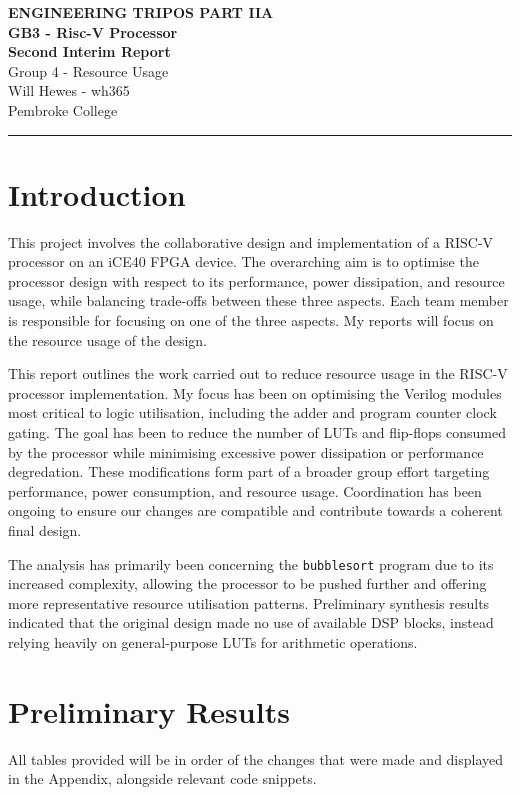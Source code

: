 \documentclass[a4paper,10pt]{article}
\renewcommand{\maketitle}{
    \begin{center}
        \LARGE \textbf{ENGINEERING TRIPOS PART IIA} \\ 
        \vspace{0.5em}
        \Large \textbf{GB3 - Risc-V Processor} \\ 
        \vspace{0.5em}
        \textbf{Second Interim Report} \\
        \large Group 4 - Resource Usage \\
        \vspace{1em}
        \large Will Hewes - wh365 \\ 
        Pembroke College \\ 
        \vspace{0.5em}
    \end{center}
}
\begin{document}
%
\maketitle
\hrule
\tableofcontents
\newpage

\section{Introduction}
\label{sec:Introduction}

This project involves the collaborative design and implementation 
of a RISC-V processor on an iCE40 FPGA device. 
The overarching aim is to optimise 
the processor design with respect to its 
performance, power dissipation, and resource usage, 
while balancing trade-offs between these three aspects. 
Each team member is responsible for focusing on one of the three aspects.
My reports will focus on the resource usage of the design.

This report outlines the work carried out to reduce resource usage 
in the RISC-V processor implementation. 
My focus has been on optimising the Verilog modules 
most critical to logic utilisation, 
including the adder and program counter clock gating. 
The goal has been to reduce the number of LUTs and flip-flops consumed
by the processor while minimising 
excessive power dissipation or performance degredation.
These modifications form part of a broader group effort targeting performance, 
power consumption, and resource usage. 
Coordination has been ongoing to ensure our changes are compatible and 
contribute towards a coherent final design.

The analysis has primarily been concerning the
\texttt{bubblesort} program due to its increased complexity,
allowing the processor to be pushed further and 
offering more representative resource utilisation patterns.
Preliminary synthesis results indicated that the original design 
made no use of available DSP blocks, 
instead relying heavily on general-purpose LUTs for arithmetic operations.

\section{Preliminary Results}
\label{sec:Preliminary_Results}
All tables provided will be in order of the changes that were made
and displayed in the Appendix, alongside relevant code snippets.
\end{document}
